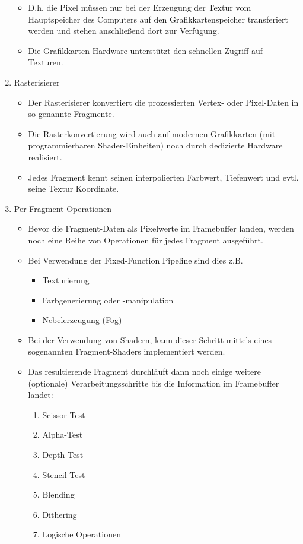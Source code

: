 \documentclass{scrartcl}
\begin{document}
\begin{enumerate}
\begin{itemize}
		\item D.h. die Pixel müssen nur bei der Erzeugung der Textur vom Hauptspeicher des Computers auf den Grafikkartenspeicher transferiert werden und stehen anschließend dort zur Verfügung.
		\item Die Grafikkarten-Hardware unterstützt den schnellen Zugriff auf Texturen.
	\end{itemize}
	\item Rasterisierer
	\begin{itemize}
		\item Der Rasterisierer konvertiert die prozessierten Vertex- oder Pixel-Daten in so genannte Fragmente.
		\item Die Rasterkonvertierung wird auch auf modernen Grafikkarten (mit programmierbaren Shader-Einheiten) noch durch dedizierte Hardware realisiert.
		\item Jedes Fragment kennt seinen interpolierten Farbwert, Tiefenwert und evtl. seine Textur Koordinate.
	\end{itemize}
	\item Per-Fragment Operationen
	\begin{itemize}
		\item Bevor die Fragment-Daten als Pixelwerte im Framebuffer landen, werden noch eine Reihe von Operationen für jedes Fragment ausgeführt.
		\item Bei Verwendung der Fixed-Function Pipeline sind dies z.B.
		\begin{itemize}
			\item Texturierung
			\item Farbgenerierung oder -manipulation
			\item Nebelerzeugung (Fog)
		\end{itemize}
		\item Bei der Verwendung von Shadern, kann dieser Schritt mittels eines sogenannten Fragment-Shaders implementiert werden.
		\item Das resultierende Fragment durchläuft dann noch einige weitere (optionale) Verarbeitungsschritte bis die Information im Framebuffer landet:
		\begin{enumerate}
			\item Scissor-Test
			\item Alpha-Test
			\item Depth-Test
			\item Stencil-Test
			\item Blending
			\item Dithering
			\item Logische Operationen
		\end{enumerate}
	\end{itemize}
\end{enumerate}
\end{document}
